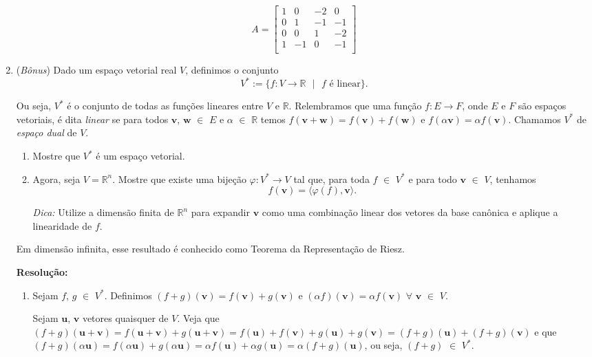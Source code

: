 \documentclass[leqno]{article}
\begin{document}
\begin{enumerate}
    $$A=\begin{bmatrix}
    1 & 0 & -2 & 0\\
    0 & 1 & -1 & -1\\
    0 & 0 & 1 & -2\\
    1 & -1 & 0 & -1\\
    \end{bmatrix}$$
    
    \item (\textit{Bônus}) Dado um espaço vetorial real $V$, definimos o conjunto
    $$V^*:=\{f:V\rightarrow\mathbb{R}\text{ }|\text{ }f\text{ é linear}\}\text{.}$$
    
    Ou seja, $V^*$ é o conjunto de todas as funções lineares entre $V$ e $\mathbb{R}$. Relembramos que uma função $f:E\rightarrow F$, onde $E$ e $F$ são espaços vetoriais, é dita \textit{linear} se para todos $\textbf{v}$, $\textbf{w}$ $\in$ $E$ e $\alpha$ $\in$ $\mathbb{R}$ temos $f(\textbf{v}+\textbf{w})=f(\textbf{v})+f(\textbf{w})$ e $f(\alpha\textbf{v})=\alpha f(\textbf{v})$. Chamamos $V^*$ de \textit{espaço dual} de $V$.
    
    \begin{enumerate}
        \item Mostre que $V^*$ é um espaço vetorial.
        \item Agora, seja $V=\mathbb{R}^n$. Mostre que existe uma bijeção $\varphi:V^*\rightarrow V$ tal que, para toda $f$ $\in$ $V^*$ e para todo $\textbf{v}$ $\in$ $V$, tenhamos
        $$f(\textbf{v})=\langle\varphi(f),\textbf{v}\rangle\text{.}$$
        
        \textit{Dica:} Utilize a dimensão finita de $\mathbb{R}^n$ para expandir $\textbf{v}$ como uma combinação linear dos vetores da base canônica e aplique a linearidade de $f$.
    \end{enumerate}
    
    Em dimensão infinita, esse resultado é conhecido como Teorema da Representação de Riesz.
    
    \textbf{Resolução:}
    \begin{enumerate}
        \item Sejam $f$, $g$ $\in$ $V^*$. Definimos $(f+g)(\textbf{v})=f(\textbf{v})+g(\textbf{v})$ e $(\alpha f)(\textbf{v})=\alpha f(\textbf{v})$ $\forall$ $\textbf{v}$ $\in$ $V$.
        
        Sejam $\textbf{u}$, $\textbf{v}$ vetores quaisquer de $V$. Veja que $(f+g)(\textbf{u}+\textbf{v})=f(\textbf{u}+\textbf{v})+g(\textbf{u}+\textbf{v})=f(\textbf{u})+f(\textbf{v})+g(\textbf{u})+g(\textbf{v})=(f+g)(\textbf{u})+(f+g)(\textbf{v})$ e que $(f+g)(\alpha\textbf{u})=f(\alpha\textbf{u})+g(\alpha\textbf{u})=\alpha f(\textbf{u})+\alpha g(\textbf{u})=\alpha(f+g)(\textbf{u})$, ou seja, $(f+g)$ $\in$ $V^*$.
        

\end{enumerate}
\end{enumerate}
\end{document}
